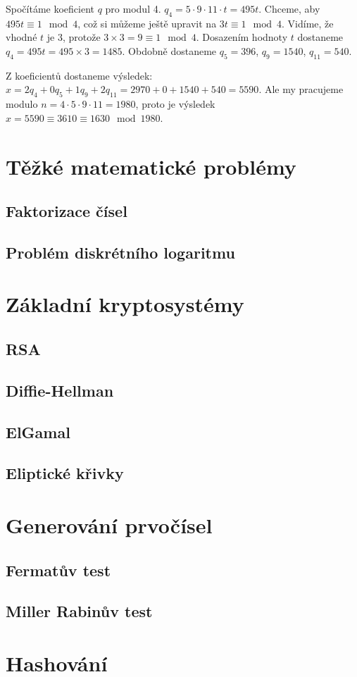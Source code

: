 \documentclass[10pt,a4paper]{article}
\begin{document}
Spočítáme koeficient $q$ pro modul 4. $q_4 = 5\cdot9\cdot11\cdot t = 495t$. Chceme, aby $495t \equiv 1 \mod 4$, což si můžeme ještě upravit na $3t \equiv 1 \mod 4$. Vidíme, že vhodné $t$ je 3, protože $3\times 3 = 9 \equiv 1 \mod 4$. Dosazením hodnoty $t$ dostaneme $q_4 = 495t = 495 \times 3 = 1485$. Obdobně dostaneme $q_5 = 396$, $q_9 = 1540$, $q_{11} = 540$.

Z koeficientů dostaneme výsledek: $x = 2q_4 + 0q_5 + 1q_9 + 2q_{11} = 2970 + 0 + 1540 + 540 = 5590$. Ale my pracujeme modulo $n = 4\cdot5\cdot9\cdot11 = 1980$, proto je výsledek $x = 5590 \equiv 3610 \equiv 1630 \mod 1980$.

\section{Těžké matematické problémy}
\subsection{Faktorizace čísel}
\subsection{Problém diskrétního logaritmu}

\section{Základní kryptosystémy}
\subsection{RSA}
\subsection{Diffie-Hellman}
\subsection{ElGamal}
\subsection{Eliptické křivky}

\section{Generování prvočísel}
\subsection{Fermatův test}
\subsection{Miller Rabinův test}

\section{Hashování}
\end{document}
